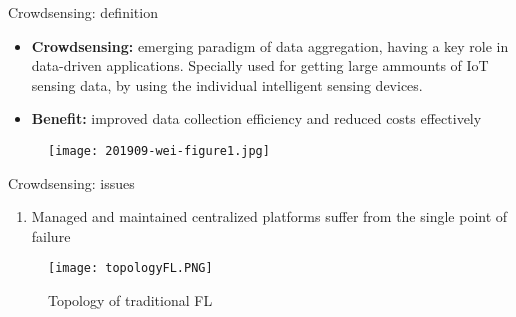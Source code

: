 \begin{frame}{Crowdsensing: definition}
  \begin{itemize}
  \item \textbf{Crowdsensing:} emerging paradigm of data aggregation\cite{paper1}, having a key role in data-driven applications. Specially used for getting large ammounts of IoT sensing data, by using the individual intelligent sensing devices.
  \item \textbf{Benefit:} improved data collection efficiency and reduced costs effectively\cite{paper2}
  \end{itemize}
  \begin{figure}[h]
        \centering
        \texttt{[image: 201909-wei-figure1.jpg]}
      \end{figure}
\end{frame}

\begin{frame}{Crowdsensing: issues}
\begin{multicols}{2}
  		\begin{enumerate}
   			\item Managed and maintained \alert{centralized platforms} suffer from the single point of failure
  		\end{enumerate}
  		\begin{figure}[h]
                \centering
                \texttt{[image: topologyFL.PNG]}
                \caption{Topology of traditional FL}
            \end{figure}
  \end{multicols}
\end{frame}


